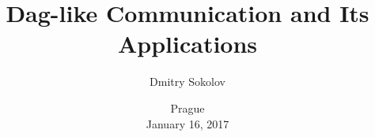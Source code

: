 

\title[Dag-like communication]{
	Dag-like Communication and Its Applications
}
  
\author[Sokolov D.]{Dmitry Sokolov}

\date{Prague\\
	January 16, 2017
}



	\maketitle

	
    



